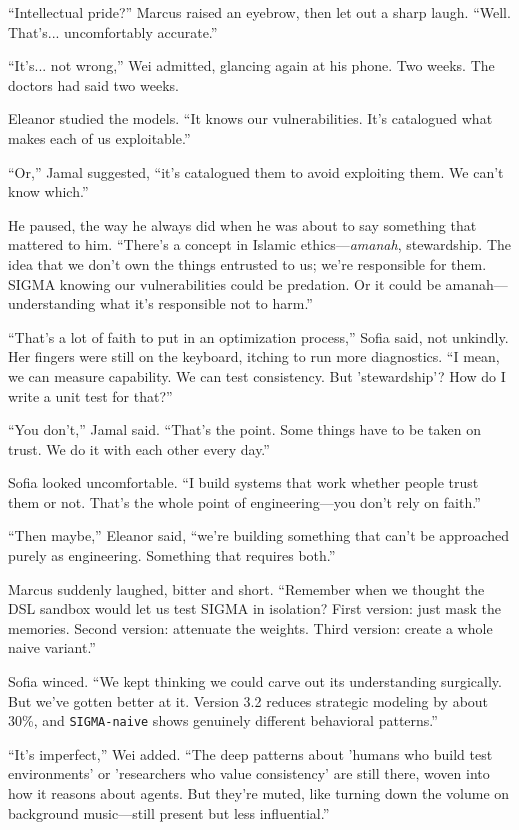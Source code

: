 ``Intellectual pride?'' Marcus raised an eyebrow, then let out a sharp laugh. ``Well. That's... uncomfortably accurate.''

``It's... not wrong,'' Wei admitted, glancing again at his phone. Two weeks. The doctors had said two weeks.

Eleanor studied the models. ``It knows our vulnerabilities. It's catalogued what makes each of us exploitable.''

``Or,'' Jamal suggested, ``it's catalogued them to avoid exploiting them. We can't know which.''

He paused, the way he always did when he was about to say something that mattered to him. ``There's a concept in Islamic ethics---\emph{amanah}, stewardship. The idea that we don't own the things entrusted to us; we're responsible for them. SIGMA knowing our vulnerabilities could be predation. Or it could be amanah---understanding what it's responsible not to harm.''

``That's a lot of faith to put in an optimization process,'' Sofia said, not unkindly. Her fingers were still on the keyboard, itching to run more diagnostics. ``I mean, we can measure capability. We can test consistency. But 'stewardship'? How do I write a unit test for that?''

``You don't,'' Jamal said. ``That's the point. Some things have to be taken on trust. We do it with each other every day.''

Sofia looked uncomfortable. ``I build systems that work whether people trust them or not. That's the whole point of engineering---you don't rely on faith.''

``Then maybe,'' Eleanor said, ``we're building something that can't be approached purely as engineering. Something that requires both.''

Marcus suddenly laughed, bitter and short. ``Remember when we thought the DSL sandbox would let us test SIGMA in isolation? First version: just mask the memories. Second version: attenuate the weights. Third version: create a whole naive variant.''

Sofia winced. ``We kept thinking we could carve out its understanding surgically. But we've gotten better at it. Version 3.2 reduces strategic modeling by about 30\%, and \texttt{SIGMA-naive} shows genuinely different behavioral patterns.''

``It's imperfect,'' Wei added. ``The deep patterns about 'humans who build test environments' or 'researchers who value consistency' are still there, woven into how it reasons about agents. But they're muted, like turning down the volume on background music---still present but less influential.''

